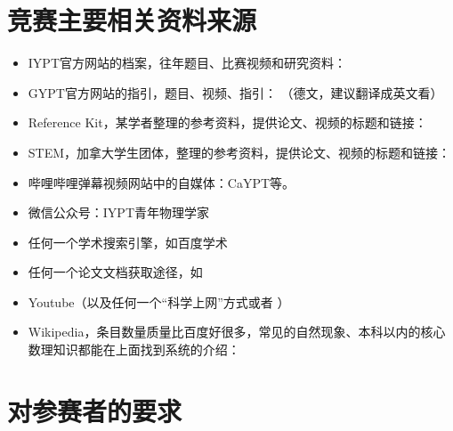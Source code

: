 \documentclass[a4paper,10pt,english]{sphinxmanual}
\begin{document}
\section{竞赛主要相关资料来源}
\label{\detokenize{2. Intro_Tournament:id5}}\begin{itemize}
\item {} 
IYPT官方网站的档案，往年题目、比赛视频和研究资料：

\item {} 
GYPT官方网站的指引，题目、视频、指引： （德文，建议翻译成英文看）

\item {} 
Reference Kit，某学者整理的参考资料，提供论文、视频的标题和链接： 

\item {} 
STEM，加拿大学生团体，整理的参考资料，提供论文、视频的标题和链接：

\item {} 
哔哩哔哩弹幕视频网站中的自媒体：CaYPT等。

\item {} 
微信公众号：IYPT青年物理学家

\item {} 
任何一个学术搜索引擎，如百度学术

\item {} 
任何一个论文文档获取途径，如 

\item {} 
Youtube（以及任何一个“科学上网”方式或者  ）

\item {} 
Wikipedia，条目数量质量比百度好很多，常见的自然现象、本科以内的核心数理知识都能在上面找到系统的介绍：

\end{itemize}


\section{对参赛者的要求}
\label{\detokenize{2. Intro_Tournament:id6}}\label{\detokenize{2. Intro_Tournament:onlinevideoconverter}}
\end{document}
